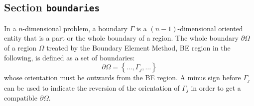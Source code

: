 \documentclass[a4paper,fleqn]{book}
\begin{document}
\subsection{Section \texttt{boundaries}}
\label{sec:boundaries}

In a $n$-dimensional problem, a boundary $\Gamma$ is a $(n-1)$-dimensional oriented entity that is a part or the whole boundary of a region. The whole boundary $\partial\Omega$ of a region $\Omega$ treated by the Boundary Element Method, BE region in the following, is defined as a set of boundaries:
\begin{equation}
\partial\Omega = \left\{\ldots,\Gamma_j,\ldots\right\}
\end{equation}
whose orientation must be outwards from the BE region. A minus sign before $\Gamma_j$ can be used to indicate the reversion of the orientation of $\Gamma_j$ in order to get a compatible $\partial\Omega$. 
\end{document}
